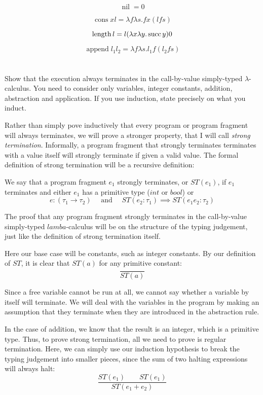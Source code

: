 \documentclass{article}
\newcommand{\problem}[1]
{\subsubsection*{} %
\vspace{-16pt} \section{} \vspace{-22pt} \qquad
#1%
\bigskip \bigskip
}
\begin{document}
\newcommand{\nil}{\operatorname{nil}}
\newcommand{\cons}{\operatorname{cons}}
\newcommand{\length}{\operatorname{length}}
\newcommand{\append}{\operatorname{append}}
\[
\nil = 0
\]

\[
\cons x l = \lambda f \lambda s.  f x (l f s)
\]


\[
\length l = l (\lambda x \lambda y. \succe y) 0
\]

\[
\append l_1 l_2 = \lambda f \lambda s. l_1 f (l_2 f s)
\]

\problem{Show that the execution always terminates in the call-by-value
simply-typed $\lambda$-calculus. You need to consider only variables, integer
constants, addition, abstraction and application. If you use induction, state
precisely on what you induct.
}

Rather than simply pove inductively that every program or program fragment will
always terminates, we will prove a stronger property, that I will call
\emph{strong termination}.  Informally, a program fragment that strongly
terminates terminates with a value itself will strongly terminate if given a
valid value.  The formal definition of strong termination will be a recursive
definition:

We say that a program fragment $e_1$ strongly terminates, or $ST(e_1)$, if
$e_1$ terminates and either $e_1$ has a primitive type ($int$ or $bool$)
or
\[
e : (\tau_1 \to \tau_2) \quad \text{ and }
\quad ST(e_2: \tau_1) \implies ST(e_1 e_2 : \tau_2)
\]

The proof that any program fragment strongly terminates in the call-by-value
simply-typed $lamba$-calculus will be on the structure of the typing judgement,
just like the definition of strong termination itself.

Here our base case will be constants, such as integer constants.
By our definition of $ST$, it is clear that $ST(a)$ for any primitive constant:
\[
\frac{}{ST(a)}
\]

Since a free variable cannot be run at all, we cannot say whether a variable
by itself will terminate.  We will deal with the variables in the program by 
making an assumption that they terminate when they are introduced in the
abstraction rule.

In the case of addition, we know that the result is an integer, which is a
primitive type.  Thus, to prove strong termination, all we need to prove is
regular termination. Here, we can simply use our induction hypothesis
to break the typing judgement into smaller pieces, since the sum of two halting
expressions will always halt:
\[
\frac{ST(e_1) \qquad ST(e_1)}
{ST(e_1 + e_2)}
\]
\end{document}

